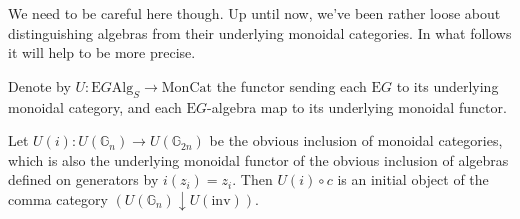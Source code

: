 We need to be careful here though. Up until now, we've been rather loose about distinguishing algebras from their underlying monoidal categories. In what follows it will help to be more precise.

\begin{defn} Denote by $U: \mathrm{E}G\mathrm{Alg}_S \to \mathrm{MonCat}$ the functor sending each $\mathrm{E}G$ to its underlying monoidal category, and each $\mathrm{E}G$-algebra map to its underlying monoidal functor. \end{defn}

\begin{prop} Let $U(i): U(\mathbb{G}_n) \to U(\mathbb{G}_{2n})$ be the obvious inclusion of monoidal categories, which is also the underlying monoidal functor of the obvious inclusion of algebras defined on generators by $i(z_i) = z_i$. Then $U(i) \circ c$ is an initial object of the comma category $(U(\mathbb{G}_n) \downarrow U(\mathrm{inv}))$.
\end{prop}
